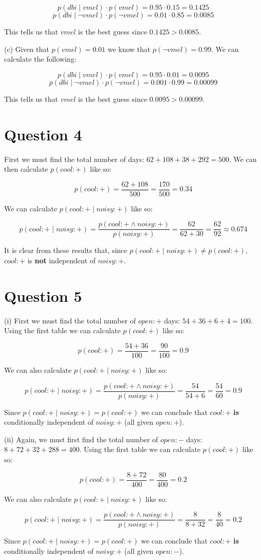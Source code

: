 \documentclass[12pt]{article}
\begin{document}
$$p(dbi \mid vmel) \cdot p(vmel) = 0.95 \cdot 0.15 = 0.1425$$
$$p(dbi \mid \neg vmel) \cdot p(\neg vmel) = 0.01 \cdot 0.85 = 0.0085$$

This tells us that $vmel$ is the best guess since $0.1425 > 0.0085$.

\noindent (c) Given that $p(vmel) = 0.01$ we know that $p(\neg vmel) = 0.99$. We can calculate the following:

$$p(dbi \mid vmel) \cdot p(vmel) = 0.95 \cdot 0.01 = 0.0095$$
$$p(dbi \mid \neg vmel) \cdot p(\neg vmel) = 0.001 \cdot 0.99 = 0.00099$$

This tells us that $vmel$ is the best guess since $0.0095 > 0.00099$.

\section*{Question 4}

First we must find the total number of days: $62 + 108 + 38 + 292 = 500$. We can then calculate $p(cool:+)$ like so:

$$p(cool:+) = \frac{62 + 108}{500} = \frac{170}{500} = 0.34$$

We can calculate $p(cool:+ \mid noisy:+)$ like so:

$$p(cool:+ \mid noisy:+) = \frac{p(cool:+ \wedge noisy:+)}{p(noisy:+)} = \frac{62}{62 + 30} = \frac{62}{92} \approx 0.674$$

It is clear from these results that, since $p(cool:+ \mid noisy:+) \neq p(cool:+)$, $cool:+$ is \textbf{not} independent of $noisy:+$.

\section*{Question 5}

\noindent (i) First we must find the total number of $open:+$ days: $54 + 36 + 6 + 4 = 100$. Using the first table we can calculate $p(cool:+)$ like so:

$$p(cool:+) = \frac{54 + 36}{100} = \frac{90}{100} = 0.9$$

We can also calculate $p(cool:+ \mid noisy:+)$ like so:

$$p(cool:+ \mid noisy:+) = \frac{p(cool:+ \wedge noisy:+)}{p(noisy:+)} = \frac{54}{54 + 6} = \frac{54}{60} = 0.9$$

Since $p(cool:+ \mid noisy:+) = p(cool:+)$ we can conclude that $cool:+$ \textbf{is} conditionally independent of $noisy:+$ (all given $open:+$).

\noindent (ii) Again, we must first find the total number of $open:-$ days: $8+ 72 + 32 + 288 = 400$. Using the first table we can calculate $p(cool:+)$ like so:

$$p(cool:+) = \frac{8 + 72}{400} = \frac{80}{400} = 0.2$$

We can also calculate $p(cool:+ \mid noisy:+)$ like so:

$$p(cool:+ \mid noisy:+) = \frac{p(cool:+ \wedge noisy:+)}{p(noisy:+)} = \frac{8}{8 + 32} = \frac{8}{40} = 0.2$$

Since $p(cool:+ \mid noisy:+) = p(cool:+)$ we can conclude that $cool:+$ \textbf{is} conditionally independent of $noisy:+$ (all given $open:-$).
\end{document}
